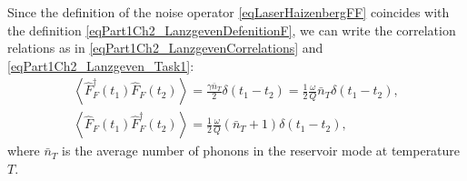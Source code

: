 Since the definition of the noise operator
\eqref{eqLaserHaizenbergFF} coincides with
the definition \eqref{eqPart1Ch2_LanzgevenDefenitionF}, we can
write the correlation relations as in
\eqref{eqPart1Ch2_LanzgevenCorrelations} and \eqref{eqPart1Ch2_Lanzgeven_Task1}:
\begin{eqnarray}
\left<\hat{F}_{F}^{\dag}\left(t_1\right)\hat{F}_{F}\left(t_2\right)\right> = 
\frac{\gamma \bar{n}_T}{2} \delta\left(t_1 - t_2\right) = 
\frac{1}{2}\frac{\omega}{Q}\bar{n}_T\delta\left(t_1 - t_2\right),
\nonumber \\
\left<\hat{F}_{F}\left(t_1\right)\hat{F}_{F}^{\dag}\left(t_2\right)\right> = 
\frac{1}{2}\frac{\omega}{Q}\left(\bar{n}_T + 1 \right)\delta\left(t_1 - t_2\right),
\label{eqLaserHaizenbergFFCorrel}
\end{eqnarray}
where $\bar{n}_T$ is the average number of phonons in the reservoir mode at
temperature $T$.